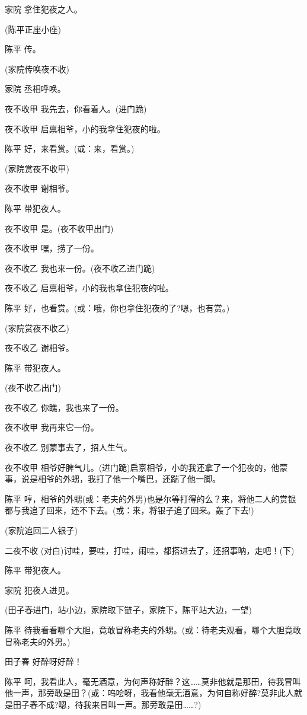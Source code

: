 家院 拿住犯夜之人。

(陈平正座小座)

陈平 传。

(家院传唤夜不收)

家院 丞相呼唤。

夜不收甲 我先去，你看着人。(进门跪)

夜不收甲 启禀相爷，小的我拿住犯夜的啦。

陈平 好，来看赏。(或：来，看赏。)

(家院赏夜不收甲)

夜不收甲 谢相爷。

陈平 带犯夜人。

夜不收甲 是。(夜不收甲出门)

夜不收甲 嘿，捞了一份。

夜不收乙 我也来一份。(夜不收乙进门跪)

夜不收乙 启禀相爷，小的我也拿住犯夜的啦。

陈平 好，也看赏。(或：哦，你也拿住犯夜的了?嗯，也有赏。)

(家院赏夜不收乙)

夜不收乙 谢相爷。

陈平 带犯夜人。

(夜不收乙出门)

夜不收乙 你瞧，我也来了一份。

夜不收甲 我再来它一份。

夜不收乙 别蒙事去了，招人生气。

夜不收甲
相爷好脾气儿。(进门跪)启禀相爷，小的我还拿了一个犯夜的，他蒙事，说是相爷的外甥，我打了他一个嘴巴，还踹了他一脚。

陈平
哼，相爷的外甥(或：老夫的外男)也是尔等打得的么？来，将他二人的赏银都与我追了回来，还不下去。(或：来，将银子追了回来。轰了下去!)

(家院追回二人银子)

二夜不收 (对白)讨哇，要哇，打哇，闹哇，都搭进去了，还招事呐，走吧！(下)

陈平 带犯夜人。

家院 犯夜人进见。

(田子春进门，站小边，家院取下链子，家院下，陈平站大边，一望)

陈平
待我看看哪个大胆，竟敢冒称老夫的外甥。(或：待老夫观看，哪个大胆竟敢冒称老夫的外男。)

田子春 好醉呀好醉！

陈平
呵，我看此人，毫无酒意，为何声称好醉？这\ldots{}\ldots{}莫非他就是那田，待我冒叫他一声，那旁敢是田？(或：呜哙呀，我看他毫无酒意，为何自称好醉?莫非此人就是田子春不成?嗯，待我来冒叫一声。那旁敢是田\ldots{}\ldots{}?)

